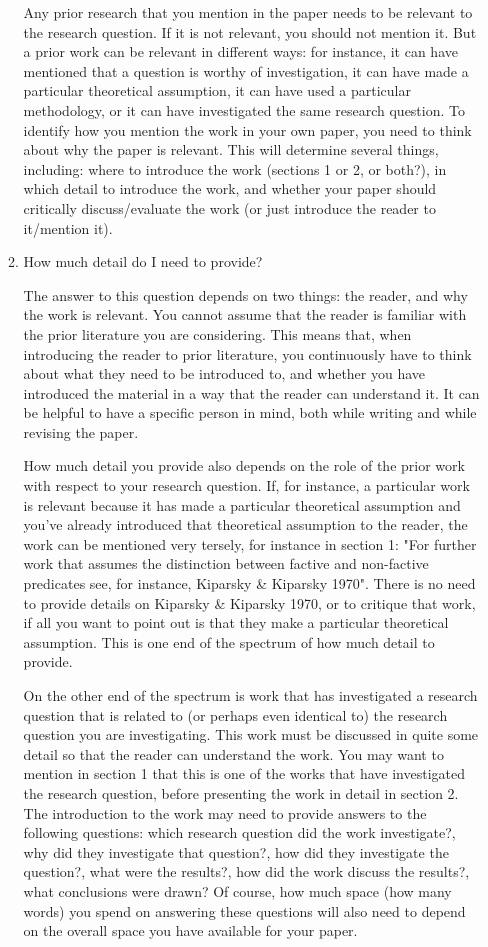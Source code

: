 \documentclass[11pt,fleqn,a4paper/thesis]{article}
\newcommand{\6}{\mbox{$[\hspace*{-.6mm}[$}}
\newcommand{\9}{\mbox{$]\hspace*{-.6mm}]$}}
\begin{document}
\begin{itemize}[itemsep=-1pt,leftmargin=2.5ex,topsep=-2pt]
\begin{enumerate}
Any prior research that you mention in the paper needs to be relevant to the research question. If it is not relevant, you should not mention it. But a prior work can be relevant in different ways: for instance, it can have mentioned that a question is worthy of investigation, it can have made a particular theoretical assumption, it can have used a particular methodology, or it can have investigated the same research question. To identify how you mention the work in your own paper, you need to think about why the paper is relevant. This will determine several things, including: where to introduce the work (sections 1 or 2, or both?), in which detail to introduce the work, and whether your paper should critically discuss/evaluate the work (or just introduce the reader to it/mention it).

\item How much detail do I need to provide?

The answer to this question depends on two things: the reader, and why the work is relevant. You cannot assume that the reader is familiar with the prior literature you are considering. This means that, when introducing the reader to prior literature, you continuously have to think about what they need to be introduced to, and whether you have introduced the material in a way that the reader can understand it. It can be helpful to have a specific person in mind, both while writing and while revising the paper. 

How much detail you provide also depends on the role of the prior work with respect to your research question. If, for instance, a particular work is relevant because it has made a particular theoretical assumption and you've already introduced that theoretical assumption to the reader, the work can be mentioned very tersely, for instance in section 1: "For further work that assumes the distinction between factive and non-factive predicates see, for instance, Kiparsky \& Kiparsky 1970". There is no need to provide details on Kiparsky \& Kiparsky 1970, or to critique that work, if all you want to point out is that they make a particular theoretical assumption. This is one end of the spectrum of how much detail to provide. 

On the other end of the spectrum is work that has investigated a research question that is related to (or perhaps even identical to) the research question you are investigating. This work must be discussed in quite some detail so that the reader can understand the work. You may want to mention in section 1 that this is one of the works that have investigated the research question, before presenting the work in detail in section 2. The introduction to the work may need to provide answers to the following questions: which research question did the work investigate?, why did they investigate that question?, how did they investigate the question?, what were the results?, how did the work discuss the results?, what conclusions were drawn? Of course, how much space (how many words) you spend on answering these questions will also need to depend on the overall space you have available for your paper. 


\end{enumerate}
\end{itemize}
\end{document}
